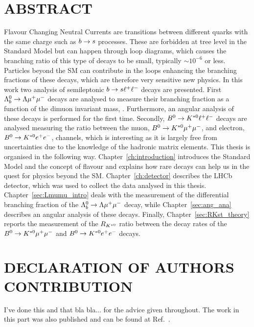 \chapter*{ABSTRACT}
%
Flavour Changing Neutral Currents are transitions between different quarks with the same charge such as $b\rightarrow s$ processes. These are forbidden at tree level in the Standard Model but
can happen through loop diagrams, which causes the branching ratio of this type of decays
to be small, typically $\sim 10^{-6}$ or less. Particles beyond the SM can contribute in the loops enhancing
the branching fractions of these decays, which are therefore very sensitive new physics.
In this work two analysis of semileptonic $b\rightarrow s\ell^+ \ell^-$ decays are presented.
First $\Lambda^0_b\rightarrow\Lambda\mu^+\mu^-$ decays are analysed to measure their branching fraction as a function
of the dimuon invariant mass, \qsq. Furthermore, an angular analysis of these decays is performed for the first time. 
Secondly, $B^0\rightarrow K^{*0}\ell^+ \ell^-$ decays are analysed measuring the ratio between the muon, $B^0\rightarrow K^{*0}\mu^+\mu^-$, 
and electron, $B^0\rightarrow K^{*0}e^+ e^-$, channels, which is interesting as it is largely free
from uncertainties due to the knowledge of the hadronic matrix elements.
This thesis is organised in the following way. Chapter~\ref{ch:introduction} introduces the Standard Model and 
the concept of flavour and explains how rare decays can help us in the quest for physics beyond the SM.
Chapter~\ref{ch:detector} describes the LHCb detector, which was used to collect the data analysed in this thesis.
Chapter~\ref{sec:Lmumu_intro} deals with the measurement of the differential branching fraction of the $\Lambda^0_b\rightarrow\Lambda\mu^+\mu^-$ 
decay, while Chapter~\ref{sec:ang_ana} describes an angular analysis of these decays.
Finally, Chapter~\ref{sec:RKst_theory} reports the measurement of the $R_{K^{*0}}$ ratio between the decay rates
of the $B^0\rightarrow K^{*0}\mu^+\mu^-$ and $B^0\rightarrow K^{*0}e^+ e^-$ decays.
%
\clearpage

\chapter*{DECLARATION OF AUTHORS CONTRIBUTION}
%
I've done this and that bla bla...
for the advice given throughout. The work in this part was also published and can be found at Ref.~\cite{Aaij:2015xza}.

